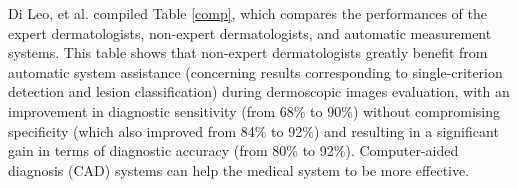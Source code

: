 Di Leo, et al. \cite{di2015web} compiled Table \ref{comp}, which compares the performances of the expert dermatologists, non-expert dermatologists, and automatic measurement systems. This table shows that non-expert dermatologists greatly benefit from automatic system assistance (concerning results corresponding to single-criterion detection and lesion classification) during dermoscopic images evaluation, with an improvement in diagnostic sensitivity (from 68$\%$ to 90$\%$) without compromising specificity (which also improved from 84$\%$ to 92$\%$) and resulting in a significant gain in terms of diagnostic accuracy (from 80$\%$ to 92$\%$). Computer-aided diagnosis (CAD) systems can help the medical system to be more effective.

\begin{table}[!htbp]
\centering
\caption{Performance comparison \cite{di2015web}.}\label{comp}
\end{table}






